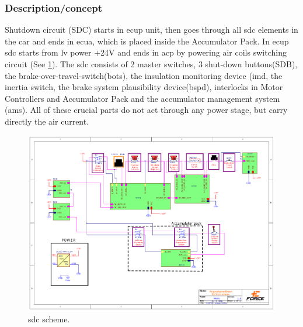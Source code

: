
\subsubsection{Description/concept}

Shutdown circuit (SDC) starts in \gls{ecup} unit, then goes through all \gls{sdc} elements in the car and ends in \gls{ecua}, which is placed inside the Accumulator Pack. In \gls{ecup} \gls{sdc} starts from \gls{lv} power +24V and ends in \gls{acp} by powering \gls{air} coils switching circuit (See \ref{fig:SDC-scheme}). The \gls{sdc} consists of 2 master switches, 3 shut-down buttons(SDB), the brake-over-travel-switch(\gls{bots}), the insulation monitoring device (\gls{imd}, the inertia switch, the brake system plausibility device(\gls{bspd}), interlocks in Motor Controllers and Accumulator Pack and the accumulator management system (\gls{ams}). All of these crucial parts do not act through any power stage, but carry directly the \gls{air} current.


\begin{figure}[H]
	\includegraphics[width=\textwidth, trim={2cm 3cm 2cm 2cm},clip]{./img/SDC-scheme.pdf}
	\caption{\gls{sdc} scheme.}
	\label{fig:SDC-scheme}
\end{figure}

